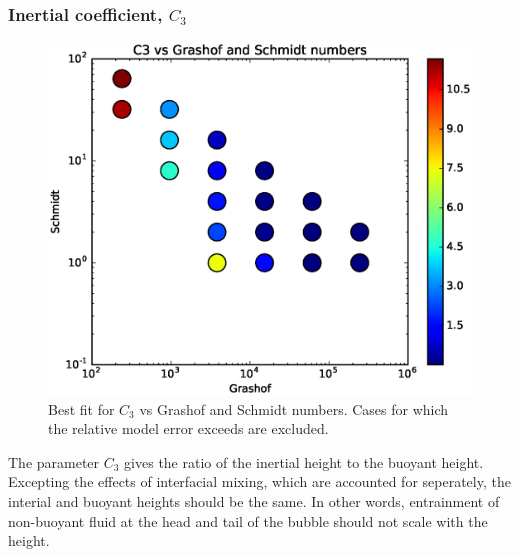 \subsubsection{Inertial coefficient, $C_3$}
\begin{figure}
\includegraphics[width=\columnwidth]{figs/C3-vs-Grashof-Schmidt}
\caption{ 
  Best fit for $C_3$ vs Grashof and Schmidt numbers.
  Cases for which the relative model error exceeds \fittol are excluded.
}
\end{figure}


The parameter $C_3$ gives the ratio of the inertial height to the buoyant height.
Excepting the effects of interfacial mixing, which are accounted for seperately, the interial and buoyant heights should be the same.
In other words, entrainment of non-buoyant fluid at the head and tail of the bubble should not scale with the height.

